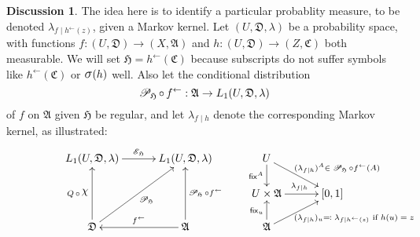 \documentclass[
twoside=true,
paper=letter,
fontsize=11pt,
pagesize=auto,
leqno,
openany,
headsepline,
overfullrule,
]{scrbook}
\theoremstyle{plain}
\theoremstyle{plain}
\theoremstyle{definition}
\newtheorem{discussion}[thm]{Discussion}
\theoremstyle{bfnoteitalic}
\theoremstyle{bfnoteroman}
\newcommand{\sigalg}[1]{\mathfrak{#1}}
\newcommand{\cali}[1]{\mathscr{#1}}
\newcommand{\defines}{\eqqcolon}
\newcommand{\sfop}[1]{\mathsf{#1}}
\newcommand{\condexpop}[1]{\mathop{\cali{E}\hspace{-1pt}}\nolimits_{#1}}
\newcommand{\condprobop}[1]{\mathop{\cali{P}\hspace{-1pt}}\nolimits_{#1}}
\newcommand{\sagb}{\mathop{\hbox{\large{$\sigma$}}}\nolimits}
\newcommand{\charfunction}[1]{{\raisebox{2pt}{$\chi$}}_{#1}}
\newcommand{\preimage}[1]{#1^{\leftarrow}}
\newcommand{\sigmaalgebra}{\sigalg{A}}
\newcommand{\sigmaalgebraiii}{\sigalg{C}}
\newcommand{\function}{f}
\newcommand{\functioniii}{h}
\newcommand{\measurespace}{X}
\newcommand{\measurespaceiii}{Z}
\newcommand{\mspaceeltiii}{z}
\newcommand{\measureiii}{\lambda}
\newcommand{\seti}{A}
\newcommand{\mkernel}[3]{#1_{#2\mid#3}}
\newcommand{\fixinthefirst}[1]{\sfop{fix}_{#1}}
\newcommand{\fixinthesecond}[1]{\sfop{fix}^{#1}}
\newcommand{\uspace}{U}%
\newcommand{\uspaceelt}{u}
\newcommand{\uspacesig}{\sigalg{D}}
\begin{document}
\begin{discussion}\label{decomposition_measure}
The idea here is to identify a particular probablity measure, to be denoted
$\mkernel{\measureiii}{\function}{\preimage{\functioniii}(\mspaceeltiii)}$, given a Markov kernel.
Let 
$(\uspace, \uspacesig, \measureiii)$ 
be a probability space, with functions
$\function:(\uspace,\uspacesig)\to (\measurespace,\sigmaalgebra)$ 
and
$\functioniii:(\uspace,\uspacesig)\to (\measurespaceiii,\sigmaalgebraiii)$
both measurable. We will set
$\sigalg{H} = \preimage{\functioniii}(\sigmaalgebraiii)$ because
subscripts do not suffer symbols like 
$\preimage{\functioniii}(\sigmaalgebraiii)$ or $\sagb(\functioniii)$
well.
Also let the conditional distribution 
\[
\condprobop{\sigalg{H}}\circ\, \preimage{\function}:
\sigmaalgebra \to L_1(\uspace,\uspacesig,\measureiii)
\]
of $\function$ on $\sigmaalgebra$ given $\sigalg{H}$ 
be regular, and let
$\mkernel{\measureiii}{\function}{\functioniii}$
denote the corresponding Markov kernel, as illustrated:
\[
\xymatrix@R=16pt@C=30pt{ 
L_1(\uspace, \uspacesig, \measureiii) \ar[r]^{\condexpop{\sigalg{H}}}
& L_1(\uspace, \uspacesig, \measureiii) 
& \uspace 
\ar[d]_-{\fixinthesecond{\seti}} 
\ar[dr]^{(\mkernel{\measureiii}{\function}{\functioniii})^\seti 
\rlap{\scriptsize $\in \condprobop{\sigalg{H}}\circ \preimage{\function}(\seti)$}
}
\\
& 
& \uspace\times\sigmaalgebra \ar[r]^{\mkernel{\measureiii}{\function}{\functioniii}} 
& [0,1] 
\\
\uspacesig 
\ar[uu]^{Q\,\circ\,\charfunction{}} 
\ar[uur]_{\condprobop{\sigalg{H}}} 
& \sigmaalgebra 
\ar[uu]_{\condprobop{\sigalg{H}}\circ \preimage{\function}} 
\ar[l]_{\preimage{\function}}
& \sigmaalgebra 
\ar[u]^{\fixinthefirst{\uspaceelt}}
\ar[ur]_{(\mkernel{\measureiii}{\function}{\functioniii})_\uspaceelt 
\rlap{\scriptsize $\defines
\mkernel{\measureiii}{\function}{\preimage{\functioniii}(\mspaceeltiii)}$ if $\functioniii(\uspaceelt)=\mspaceeltiii$}
} 
& 
\\
}
\]


\end{discussion}
\end{document}
